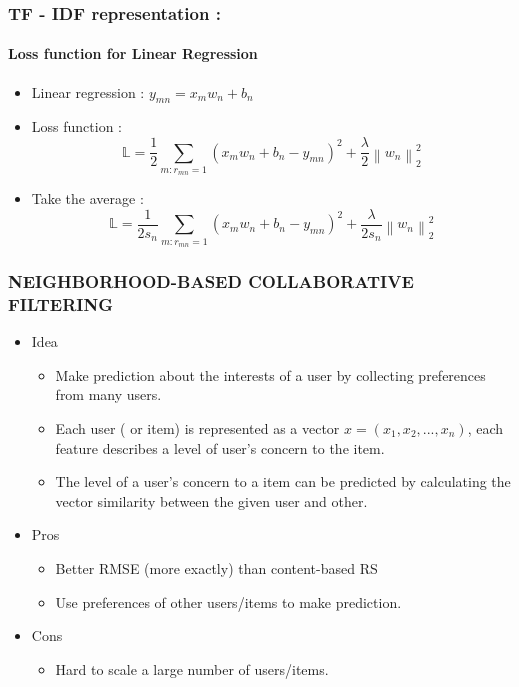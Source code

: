 \documentclass[11pt]{beamer}
\begin{document}
\begin{frame}
\frametitle{\textbf{TF - IDF representation : }} 
\framesubtitle{\textbf{Loss function for Linear Regression}}
	\begin{itemize}
		\pause\item Linear regression : $ y_{mn} = x_mw_n + b_n $
		\pause\item Loss function : 
		$$ \mathbb{L} = \dfrac{1}{2}\sum_{m:r_{mn} = 1}\left(x_mw_n+b_n-y_{mn}\right)^2 + \dfrac{\lambda}{2}\left\|w_n\right\|_2^2  $$
		\pause\item Take the average : 
		$$ \mathbb{L} = \dfrac{1}{2s_n}\sum_{m:r_{mn} = 1}\left(x_mw_n+b_n-y_{mn}\right)^2 + \dfrac{\lambda}{2s_n}\left\|w_n\right\|_2^2  $$
	\end{itemize}
\end{frame}

\begin{frame}
\frametitle{\textbf{NEIGHBORHOOD-BASED COLLABORATIVE FILTERING}}
\begin{itemize}
\pause
	\item Idea
	\begin{itemize}
		\item Make prediction about the interests of a user by collecting preferences from many users.
		\item Each user ( or item) is represented as a vector $x = (x_1, x_2,..., x_n)$, each feature describes a level of user's concern to the item.
		\item The level of a user's concern to a item can be predicted by calculating the vector similarity between the given user and other.
	\end{itemize}
	\pause\item Pros 
	\begin{itemize}
		\item Better RMSE (more exactly) than content-based RS
		\item Use preferences of other users/items to make prediction.
	\end{itemize}
	\pause\item Cons
	\begin{itemize}
		\item Hard to scale a large number of users/items.
	\end{itemize}
\end{itemize}
\end{frame}
\end{document}
